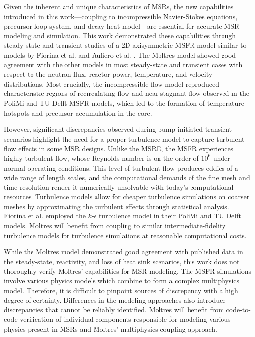 Given the inherent and unique characteristics of \glspl{MSR}, the new
capabilities introduced in this work---coupling to incompressible Navier-Stokes
equations, precursor loop system, and decay heat model---are essential for
accurate \gls{MSR} modeling and simulation. This work demonstrated these
capabilities through steady-state and transient studies of a 2D axisymmetric
\gls{MSFR} model similar to models by Fiorina et al.
\cite{fiorina_modelling_2014} and Aufiero et al.
\cite{aufiero_development_2014}. The Moltres model showed good agreement with
the other models in
most steady-state and transient cases with respect to the neutron flux, reactor
power, temperature, and velocity distributions. Most crucially, the
incompressible flow model reproduced characteristic regions of recirculating
flow and near-stagnant flow observed in the PoliMi and TU Delft \gls{MSFR}
models, which led to the formation of temperature hotspots and precursor
accumulation in the core.

However, significant discrepancies observed during pump-initiated transient
scenarios highlight the need for a proper turbulence model to capture
turbulent flow effects in some \gls{MSR} designs. Unlike the \gls{MSRE}, the
\gls{MSFR} experiences highly turbulent flow, whose Reynolds number is on the
order of $10^6$ under normal operating conditions. This level of turbulent flow
produces eddies of a wide range of length scales, and the computational demands
of the fine mesh and time resolution render it numerically unsolvable with
today's computational resources. Turbulence models allow for cheaper turbulence
simulations on coarser meshes by approximating the turbulent effects through
statistical analysis. Fiorina et al. \cite{fiorina_modelling_2014} employed the
$k$-$\epsilon$ turbulence model in their PoliMi and TU Delft models. Moltres
will benefit from coupling to similar intermediate-fidelity turbulence models
for turbulence simulations at reasonable computational costs.

While the Moltres model demonstrated good agreement with published data in the
steady-state, reactivity, and loss of heat sink scenarios, this work does not
thoroughly verify Moltres' capabilities for \gls{MSR} modeling.
The \gls{MSFR} simulations involve various physics models which combine to form
a complex multiphysics model. Therefore, it is difficult to pinpoint sources of
discrepancy with a high degree of certainty. Differences in the modeling
approaches also introduce discrepancies that cannot be reliably identified.
Moltres will benefit from code-to-code verification of
individual components responsible for modeling various physics present in
\glspl{MSR} and Moltres' multiphysics coupling approach.
